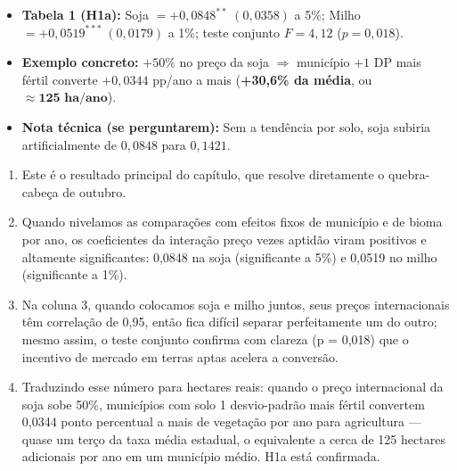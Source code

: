 \documentclass[11pt,a4paper]{article}
\begin{document}
\begin{tcolorbox}[title={\bfseries\small ÂNCORAS DO SLIDE}]
\begin{itemize}[leftmargin=*,itemsep=1mm,topsep=0.5mm]
    \item \textbf{Tabela 1 (H1a):} Soja $= +0{,}0848^{**}\;(0{,}0358)$ a 5\%; Milho $= +0{,}0519^{***}\;(0{,}0179)$ a 1\%; teste conjunto $F = 4{,}12$ ($p = 0{,}018$).
    \item \textbf{Exemplo concreto:} $+50\%$ no preço da soja $\Rightarrow$ município $+1$ DP mais fértil converte $+0{,}0344$ pp/ano a mais (\textbf{+30,6\% da média}, ou $\approx \mathbf{125\text{ ha/ano}}$).
    \item \textbf{Nota técnica (se perguntarem):} Sem a tendência por solo, soja subiria artificialmente de $0{,}0848$ para $0{,}1421$.
\end{itemize}
\end{tcolorbox}
\vspace{2mm}

\vspace{1mm}
\begin{enumerate}[leftmargin=*,label=\textbf{(\arabic*)},itemsep=2.6mm,topsep=1mm]
    \item Este é o resultado principal do capítulo, que resolve diretamente o quebra-cabeça de outubro.
    \item Quando nivelamos as comparações com efeitos fixos de município e de bioma por ano, os coeficientes da interação preço vezes aptidão viram positivos e altamente significantes: 0,0848 na soja (significante a 5\%) e 0,0519 no milho (significante a 1\%).
    \item Na coluna 3, quando colocamos soja e milho juntos, seus preços internacionais têm correlação de 0,95, então fica difícil separar perfeitamente um do outro; mesmo assim, o teste conjunto confirma com clareza (p = 0,018) que o incentivo de mercado em terras aptas acelera a conversão.
    \item Traduzindo esse número para hectares reais: quando o preço internacional da soja sobe 50\%, municípios com solo 1 desvio-padrão mais fértil convertem 0,0344 ponto percentual a mais de vegetação por ano para agricultura — quase um terço da taxa média estadual, o equivalente a cerca de 125 hectares adicionais por ano em um município médio. H1a está confirmada.
\end{enumerate}

\newpage
\end{document}
